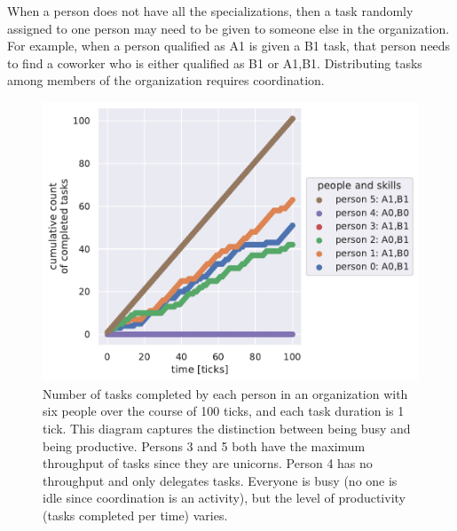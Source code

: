 When a person does not have all the specializations, then a task randomly assigned to one person may need to be given to someone else in the organization. For example, when a person qualified as A1 is given a B1 task, that person needs to find a coworker who is either qualified as B1 or A1,B1. Distributing tasks among members of the organization requires coordination.




\begin{figure}[H] %
\centering
\includegraphics[width=1\textwidth]{images/task_distribution_tasks_per_person_simCount1_skills2_levels1_taskduration1_people6_social0_ticks100.pdf}
\caption{Number of tasks completed by each person in an organization with six people over the course of 100 ticks, and each task duration is 1 tick. This diagram captures the distinction between being busy and being productive. Persons 3 and 5 both have the maximum throughput of tasks since they are unicorns. Person 4 has no throughput and only delegates tasks. Everyone is busy (no one is idle since coordination is an activity), but the level of productivity (tasks completed per time) varies.}
\label{fig:task-distribution-tasks-per-person}
\end{figure}



